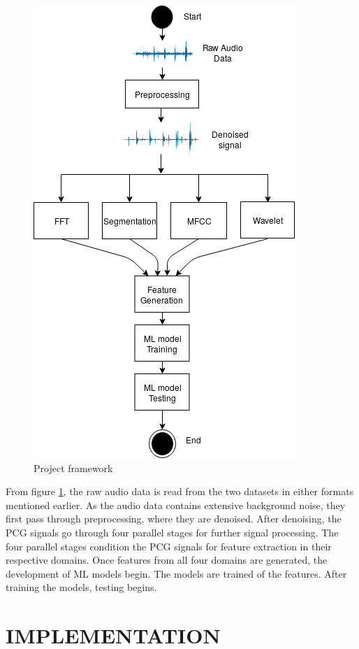 \documentclass[10pt,twocolumn]{witseiepaper}
\begin{document}
\begin{figure}[h!]
    \centering
    \includegraphics[scale=0.5]{./framework2.png}
    \caption{Project framework}
    \label{fig:frame}
\end{figure}

From figure \ref{fig:frame}, the raw audio data is read from the two datasets in either formats mentioned earlier. As the audio data contains extensive background noise, they first pass through preprocessing, where they are denoised. After denoising, the PCG signals go through four parallel stages for further signal processing. The four parallel stages condition the PCG signals for feature extraction in their respective domains. Once features from all four domains are generated, the development of ML models begin. The models are trained of the features. After training the models, testing begins.

\section{IMPLEMENTATION}
\end{document}

